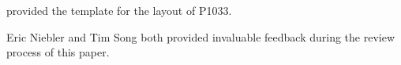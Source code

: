 \setcounter{chapter}{0}

 provided the template for the layout of
P1033.

Eric Niebler and Tim Song both provided invaluable feedback during the review process of this paper.
